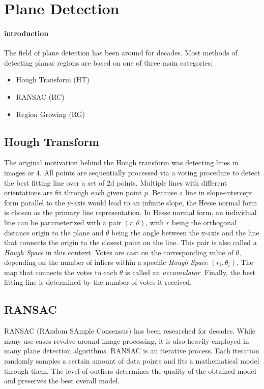 \documentclass[main.tex]{subfiles}
\begin{document}
\section{Plane Detection}

\paragraph*{introduction}
The field of plane detection has been around for decades. Most methods of detecting planar regions are based on one of three main categories:
\begin{itemize}
    \item Hough Transform (HT)
    \item RANSAC (RC)
    \item Region Growing (RG)
\end{itemize}

\subsection*{Hough Transform}
The original motivation behind the Hough transform was detecting lines in images or 4. All points are sequentially processed via a voting procedure to detect the best fitting line over a set of 2d points.
Multiple lines with different orientations are fit through each given point $p$.
Because a line in slope-intercept form parallel to the y-axis would lead to an infinite slope, the Hesse normal form is chosen as the primary line representation.
In Hesse normal form, an individual line can be parameterized with a pair $(r, \theta)$, with $r$  being the orthogonal distance origin to the plane and $\theta$ being the angle between the x-axis and the line that connects the origin to the closest point on the line.
This pair is also called a \textit{Hough Space} in this context. Votes are cast on the corresponding value of $\theta$, depending on the number of inliers within a specific \textit{Hough Space} $(r_i,\theta_i)$. The map that connects the
votes to each $\theta$ is called an \textit{accumulator}.
Finally, the best fitting line is determined by the number of votes it received.

\subsection*{RANSAC}
RANSAC (RAndom SAmple Consensus) has been researched for decades. While many use cases revolve around image processing, it is also heavily employed in many plane detection algorithms\cite{Sun_Mordohai_2019,Yang_Forstner,Ashraf_Ahmed_2017}.
RANSAC is an iterative process. Each iteration randomly samples a certain amount of data points and fits a mathematical model through them. The level of outliers determines the quality of the obtained model and preserves the best overall model.
\end{document}
